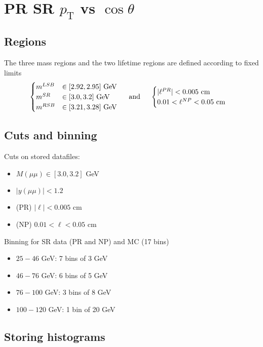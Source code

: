 \documentclass{article}
\newcommand{\pt}{p_\text{T}}
\newcommand{\cost}{\cos\theta}
\begin{document}
\section{PR SR $\pt$ vs $\cost$}
\subsection{Regions} 

The three mass regions and the two lifetime regions are defined according to fixed limits
\begin{equation}\begin{cases}
m^{LSB}&\in[2.92, 2.95] \text{ GeV}\\
m^{SR}&\in[3.0, 3.2]  \text{ GeV}\\
m^{RSB}&\in[3.21, 3.28]  \text{ GeV}\\
\end{cases}\hspace{0.5cm}\text{and}\hspace{0.5cm}
\begin{cases}
|\ell^{PR}| < 0.005\text{ cm} \\
0.01 < \ell^{NP} < 0.05\text{ cm}
\end{cases}
\end{equation}

\subsection{Cuts and binning} 

Cuts on stored datafiles:
\begin{itemize}
\item $M(\mu\mu)\in[3.0,3.2]$ GeV
\item $|y(\mu\mu)|<1.2$
\item (PR) $|\ell|<0.005$ cm
\item (NP) $0.01 < \ell < 0.05$ cm
\end{itemize}

Binning for SR data (PR and NP) and MC (17 bins)
\begin{itemize}
\item $25-46$ GeV: 7 bins of 3 GeV
\item $46-76$ GeV: 6 bins of 5 GeV
\item $76-100$ GeV: 3 bins of 8 GeV
\item $100-120$ GeV: 1 bin of 20 GeV
\end{itemize}

\subsection{Storing histograms}
\end{document}
